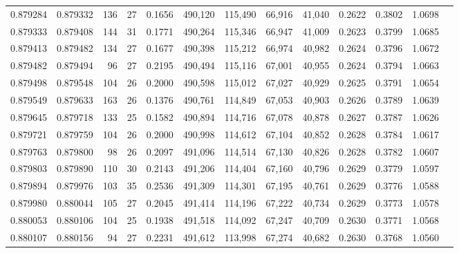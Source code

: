 \begin{tabular}{rrrrrrrrrrrrr}
0.879284 & 0.879332 &   136 &  27 &                                     0.1656 & 490,120 & 115,490 &  66,916 &  41,040 & 0.2622 & 0.3802 & 1.0698 \\
0.879333 & 0.879408 &   144 &  31 &                                     0.1771 & 490,264 & 115,346 &  66,947 &  41,009 & 0.2623 & 0.3799 & 1.0685 \\
0.879413 & 0.879482 &   134 &  27 &                                     0.1677 & 490,398 & 115,212 &  66,974 &  40,982 & 0.2624 & 0.3796 & 1.0672 \\
0.879482 & 0.879494 &    96 &  27 &                                     0.2195 & 490,494 & 115,116 &  67,001 &  40,955 & 0.2624 & 0.3794 & 1.0663 \\
0.879498 & 0.879548 &   104 &  26 &                                     0.2000 & 490,598 & 115,012 &  67,027 &  40,929 & 0.2625 & 0.3791 & 1.0654 \\
0.879549 & 0.879633 &   163 &  26 &                                     0.1376 & 490,761 & 114,849 &  67,053 &  40,903 & 0.2626 & 0.3789 & 1.0639 \\
0.879645 & 0.879718 &   133 &  25 &                                     0.1582 & 490,894 & 114,716 &  67,078 &  40,878 & 0.2627 & 0.3787 & 1.0626 \\
0.879721 & 0.879759 &   104 &  26 &                                     0.2000 & 490,998 & 114,612 &  67,104 &  40,852 & 0.2628 & 0.3784 & 1.0617 \\
0.879763 & 0.879800 &    98 &  26 &                                     0.2097 & 491,096 & 114,514 &  67,130 &  40,826 & 0.2628 & 0.3782 & 1.0607 \\
0.879803 & 0.879890 &   110 &  30 &                                     0.2143 & 491,206 & 114,404 &  67,160 &  40,796 & 0.2629 & 0.3779 & 1.0597 \\
0.879894 & 0.879976 &   103 &  35 &                                     0.2536 & 491,309 & 114,301 &  67,195 &  40,761 & 0.2629 & 0.3776 & 1.0588 \\
0.879980 & 0.880044 &   105 &  27 &                                     0.2045 & 491,414 & 114,196 &  67,222 &  40,734 & 0.2629 & 0.3773 & 1.0578 \\
0.880053 & 0.880106 &   104 &  25 &                                     0.1938 & 491,518 & 114,092 &  67,247 &  40,709 & 0.2630 & 0.3771 & 1.0568 \\
0.880107 & 0.880156 &    94 &  27 &                                     0.2231 & 491,612 & 113,998 &  67,274 &  40,682 & 0.2630 & 0.3768 & 1.0560 \\

\end{tabular}
